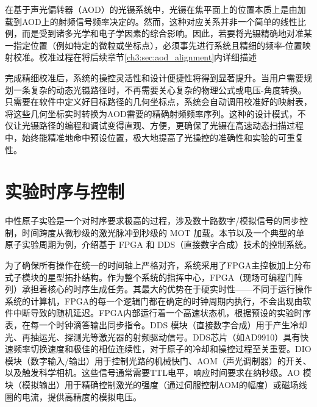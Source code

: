 \documentclass[../main.tex]{subfiles}
\begin{document}
在基于声光偏转器（AOD）的光镊系统中，光镊在焦平面上的位置本质上是由加载到AOD上的射频信号频率决定的。然而，这种对应关系并非一个简单的线性比例，而是受到诸多光学和电子学因素的综合影响。因此，若要将光镊精确地对准某一指定位置（例如特定的微粒或坐标点），必须事先进行系统且精细的频率-位置映射校准。校准过程在将后续章节\ref{ch3:sec:aod_alignment}内详细描述


完成精细校准后，系统的操控灵活性和设计便捷性将得到显著提升。当用户需要规划一条复杂的动态光镊路径时，不再需要关心复杂的物理公式或电压-角度转换。只需要在软件中定义好目标路径的几何坐标点，系统会自动调用校准好的映射表，将这些几何坐标实时转换为AOD需要的精确射频频率序列。这种的设计模式，不仅让光镊路径的编程和调试变得直观、方便，更确保了光镊在高速动态扫描过程中，始终能精准地命中预设位置，极大地提高了光操控的准确性和实验的可重复性。


\section{实验时序与控制}
\label{ch3:sec:control_system}

中性原子实验是一个对时序要求极高的过程，涉及数十路数字/模拟信号的同步控制，时间跨度从微秒级的激光脉冲到秒级的 MOT 加载。本节以及一个典型的单原子实验周期为例，介绍基于 FPGA 和 DDS（直接数字合成）技术的控制系统。


为了确保所有操作在统一的时间轴上严格对齐，系统采用了FPGA主控板加上分布式子模块的星型拓扑结构。作为整个系统的指挥中心，FPGA（现场可编程门阵列）承担着核心的时序生成任务。其最大的优势在于硬实时性——不同于运行操作系统的计算机，FPGA的每一个逻辑门都在确定的时钟周期内执行，不会出现由软件中断导致的随机延迟。FPGA内部运行着一个高速状态机，根据预设的实验时序表，在每一个时钟滴答输出同步指令。DDS 模块（直接数字合成）用于产生冷却光、再抽运光、探测光等激光器的射频驱动信号。DDS芯片（如AD9910）具有快速频率切换速度和极佳的相位连续性，对于原子的冷却和操控过程至关重要。DIO 模块（数字输入/输出）用于控制光路的机械快门、AOM（声光调制器）的开关、以及触发科学相机。这些信号通常需要TTL电平，响应时间要求在纳秒级。AO 模块（模拟输出）用于精确控制激光的强度（通过伺服控制AOM的幅度）或磁场线圈的电流，提供高精度的模拟电压。
\end{document}
